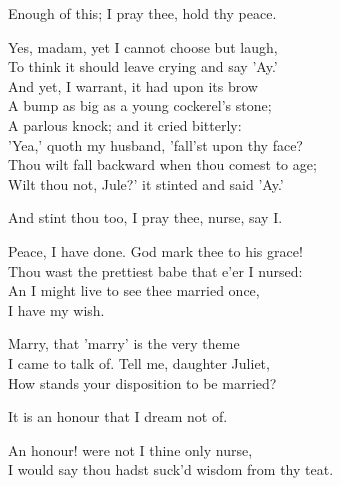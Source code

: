 \begin{speech}
Enough of this; I pray thee, hold thy peace. \\

\end{speech}
\begin{speech}
Yes, madam, yet I cannot choose but laugh, \\
To think it should leave crying and say 'Ay.' \\
And yet, I warrant, it had upon its brow \\
A bump as big as a young cockerel's stone; \\
A parlous knock; and it cried bitterly: \\
'Yea,' quoth my husband, 'fall'st upon thy face? \\
Thou wilt fall backward when thou comest to age; \\
Wilt thou not, Jule?' it stinted and said 'Ay.' \\
\end{speech}
\begin{speech}
And stint thou too, I pray thee, nurse, say I. \\

\end{speech}
\begin{speech}
Peace, I have done.   God mark thee to his grace!
\\
Thou wast the prettiest babe that e'er I nursed: \\
An I might live to see thee married once, \\
I have my wish. \\
\end{speech}
\begin{speech}
Marry, that 'marry' is the very theme \\
I came to talk of. Tell me, daughter Juliet, \\
How stands your disposition to be married? \\
\end{speech}
\begin{speech}
It is an honour that I dream not of. \\
\end{speech}
\begin{speech}
An honour! were not I thine only nurse, \\
I would say thou hadst suck'd wisdom from thy teat. \\
\end{speech}
